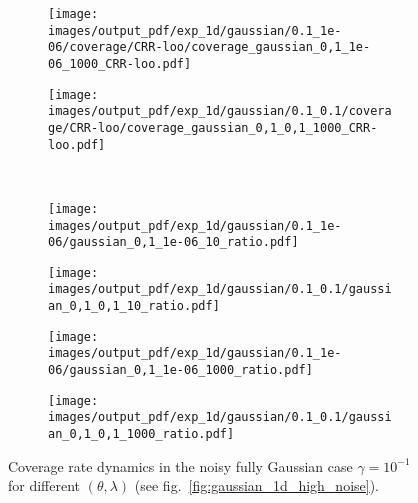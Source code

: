 \documentclass[a4paper,14pt]{extarticle}
\begin{document}
\begin{figure}
\begin{subfigure}[b]{0.25\linewidth}
  \end{subfigure}%
  \begin{subfigure}[b]{0.25\linewidth}
    \texttt{[image: images/output\_pdf/exp\_1d/gaussian/0.1\_1e-06/coverage/CRR-loo/coverage\_gaussian\_0,1\_1e-06\_1000\_CRR-loo.pdf]}
  \end{subfigure}%
  \begin{subfigure}[b]{0.25\linewidth}
    \texttt{[image: images/output\_pdf/exp\_1d/gaussian/0.1\_0.1/coverage/CRR-loo/coverage\_gaussian\_0,1\_0,1\_1000\_CRR-loo.pdf]}
  \end{subfigure}\\
  \begin{subfigure}[b]{0.25\linewidth}
    \texttt{[image: images/output\_pdf/exp\_1d/gaussian/0.1\_1e-06/gaussian\_0,1\_1e-06\_10\_ratio.pdf]}
    \caption{} \label{fig:gaussian_1d_high_noise_arb_c1}
  \end{subfigure}%
  \begin{subfigure}[b]{0.25\linewidth}
    \texttt{[image: images/output\_pdf/exp\_1d/gaussian/0.1\_0.1/gaussian\_0,1\_0,1\_10\_ratio.pdf]}
    \caption{} \label{fig:gaussian_1d_high_noise_arb_c2}
  \end{subfigure}%
  \begin{subfigure}[b]{0.25\linewidth}
    \texttt{[image: images/output\_pdf/exp\_1d/gaussian/0.1\_1e-06/gaussian\_0,1\_1e-06\_1000\_ratio.pdf]}
    \caption{} \label{fig:gaussian_1d_high_noise_arb_c3}
  \end{subfigure}%
  \begin{subfigure}[b]{0.25\linewidth}
    \texttt{[image: images/output\_pdf/exp\_1d/gaussian/0.1\_0.1/gaussian\_0,1\_0,1\_1000\_ratio.pdf]}
    \caption{} \label{fig:gaussian_1d_high_noise_arb_c4}
  \end{subfigure}%
  \caption{Coverage rate dynamics in the noisy fully Gaussian case $\gamma=10^{-1}$
  for different $(\theta, \lambda)$ (see fig.~\ref{fig:gaussian_1d_high_noise}).}
  \label{fig:gaussian_1d_high_noise_arb}
\end{figure}
\end{document}
